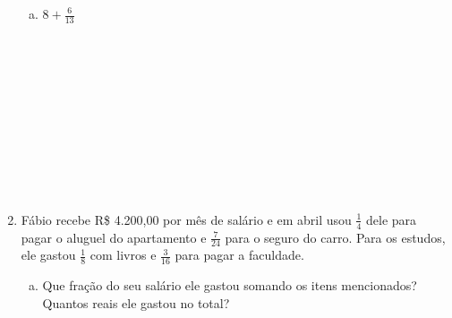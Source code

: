 \documentclass[a4paper,14pt]{article}
\begin{document}
\begin{multicols}{2}
\begin{enumerate}
\begin{enumerate}[a)]
				\item $8 + \frac{6}{13}$ \\\\\\\\\\\\\\\\\\\\\\
			\end{enumerate}
			\item Fábio recebe R\$ 4.200,00 por mês de salário e em abril usou $\frac{1}{4}$ dele para pagar o aluguel do apartamento e $\frac{7}{24}$ para o seguro do carro. Para os estudos, ele gastou $\frac{1}{8}$ com livros e $\frac{3}{16}$ para pagar a faculdade.
			\begin{enumerate}[a)]
				\item Que fração do seu salário ele gastou somando os itens mencionados? Quantos reais ele gastou no total? \\\\\\\\\\\\\\\\\\\\\\\\\\\\\\

\end{enumerate}
\end{enumerate}
\end{multicols}
\end{document}
